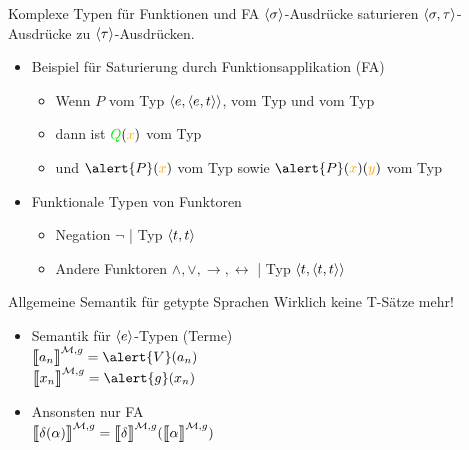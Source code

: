 \begin{frame}
  {Komplexe Typen für Funktionen und FA}
  \onslide<+->
  \onslide<+->
  ${\langle{}\sigma\rangle}$-Ausdrücke saturieren ${\langle{}\sigma,\tau\rangle}$-Ausdrücke zu ${\langle{}\tau\rangle}$-Ausdrücken.\\
  \Zeile
  \begin{itemize}[<+->]
    \item Beispiel für Saturierung durch \alert{Funktionsapplikation (FA)}
      \begin{itemize}[<+->]
        \item Wenn \alert{$P$} vom Typ \alert{${\langle{}e,{\langle{}e,t\rangle}\rangle}$},  vom Typ  und  vom Typ 
        \item dann ist $\gruen{Q}(\orongsch{x})$ vom Typ 
        \item und $\alert{P}(\orongsch{x})$ vom Typ  sowie $\alert{P}(\orongsch{x})(\orongsch{y})$ vom Typ 
      \end{itemize}
      \Zeile
    \item Funktionale Typen von \alert{Funktoren}
      \begin{itemize}[<+->]
        \item Negation $\neg$ | Typ \alert{${\langle{}t,t\rangle}$}
        \item Andere Funktoren $\wedge,\vee,\rightarrow,\leftrightarrow$ | Typ \alert{${\langle{}t,{\langle{}t,t\rangle}\rangle}$}
      \end{itemize}
  \end{itemize}
\end{frame}

\begin{frame}
  {Allgemeine Semantik für getypte Sprachen}
  \onslide<+->
  \onslide<+->
  Wirklich keine T-Sätze mehr!\\
  \Zeile
  \begin{itemize}[<+->]
    \item Semantik für ${\langle{}e\rangle}$-Typen (Terme)\\
      \Viertelzeile
      $\DEM{a_n} = \alert{V}(a_n)$ \\
      $\DEM{x_n} = \alert{g}(x_n)$
      \Halbzeile
    \item Ansonsten nur FA\\
      \alert{$\DEM{\delta(\alpha)} = \DEM{\delta}(\DEM{\alpha})$}
  \end{itemize}
\end{frame}

